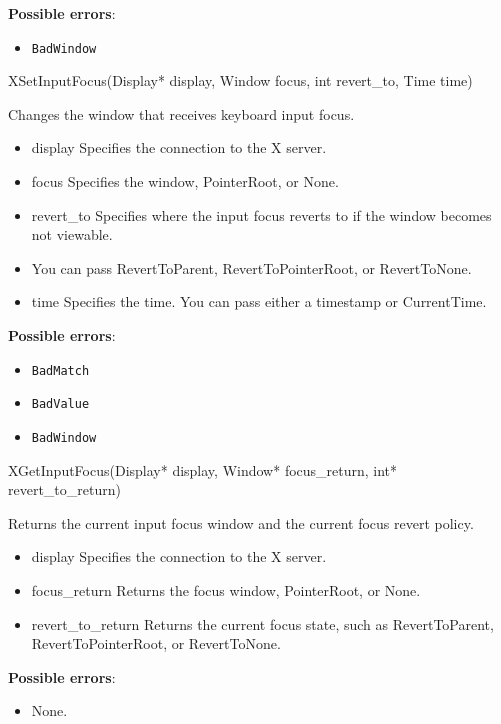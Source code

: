 \documentclass{report}
\begin{document}
\begin{itemize}
        \textbf{Possible errors}:
        \begin{itemize}
            \item \texttt{BadWindow}
        \end{itemize}

        \begin{cppcode}
        XSetInputFocus(Display* display, Window focus, int revert_to, Time time)
        \end{cppcode}
        \bigbreak \noindent
        Changes the window that receives keyboard input focus.
        \begin{itemize}
            \item display Specifies the connection to the X server.
            \item focus Specifies the window, PointerRoot, or None.
            \item revert\_to Specifies where the input focus reverts to if the window becomes not viewable.
            \item You can pass RevertToParent, RevertToPointerRoot, or RevertToNone.
            \item time Specifies the time. You can pass either a timestamp or CurrentTime.
        \end{itemize}

        \textbf{Possible errors}:
        \begin{itemize}
            \item \texttt{BadMatch}
            \item \texttt{BadValue}
            \item \texttt{BadWindow}
        \end{itemize}

        \begin{cppcode}
        XGetInputFocus(Display* display, Window* focus_return, int* revert_to_return)
        \end{cppcode}
        \bigbreak \noindent
        Returns the current input focus window and the current focus revert policy.
        \begin{itemize}
            \item display Specifies the connection to the X server.
            \item focus\_return Returns the focus window, PointerRoot, or None.
            \item revert\_to\_return Returns the current focus state, such as RevertToParent, RevertToPointerRoot, or RevertToNone.
        \end{itemize}
        \textbf{Possible errors}:
        \begin{itemize}
            \item None.
        \end{itemize}


\end{itemize}
\end{document}
